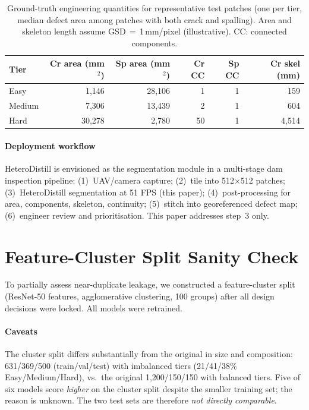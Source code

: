 \documentclass[review,authoryear]{elsarticle}
\begin{document}
\begin{table}[t]
\centering
\caption{Ground-truth engineering quantities for representative test patches (one per tier, median defect area among patches with both crack and spalling). Area and skeleton length assume GSD\,$=$\,1\,mm/pixel (illustrative). CC: connected components.}
\label{tab:supp_eng_quantities}
\setlength{\tabcolsep}{4pt}
\begin{tabular}{lrrrrr}
\toprule
Tier & Cr area (mm$^2$) & Sp area (mm$^2$) & Cr CC & Sp CC & Cr skel (mm) \\
\midrule
Easy   & 1{,}146  & 28{,}106 & 1  & 1 & 159 \\
Medium & 7{,}306  & 13{,}439 & 2  & 1 & 604 \\
Hard   & 30{,}278 & 2{,}780  & 50 & 1 & 4{,}514 \\
\bottomrule
\end{tabular}
\end{table}

\paragraph{Deployment workflow}
HeteroDistill is envisioned as the segmentation module in a multi-stage dam inspection pipeline:
(1)~UAV/camera capture;
(2)~tile into 512${\times}$512 patches;
(3)~HeteroDistill segmentation at 51 FPS (this paper);
(4)~post-processing for area, components, skeleton, continuity;
(5)~stitch into georeferenced defect map;
(6)~engineer review and prioritisation.
This paper addresses step~3 only.

\section{Feature-Cluster Split Sanity Check}
\label{sec:supp_cluster}

To partially assess near-duplicate leakage, we constructed a feature-cluster split (ResNet-50 features, agglomerative clustering, 100 groups) after all design decisions were locked. All models were retrained.

\paragraph{Caveats}
The cluster split differs substantially from the original in size and composition: 631/369/500 (train/val/test) with imbalanced tiers (21/41/38\% Easy/Medium/Hard), vs.\ the original 1{,}200/150/150 with balanced tiers. Five of six models score \emph{higher} on the cluster split despite the smaller training set; the reason is unknown. The two test sets are therefore \emph{not directly comparable}.
\end{document}
